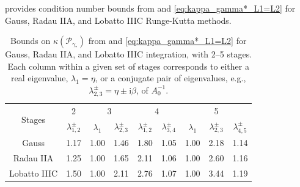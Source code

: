 \documentclass[review]{siamart}
\begin{document}
 provides condition number bounds from  and
\eqref{eq:kappa_gamma*_L1=L2} for Gauss, Radau IIA, and Lobatto IIIC Runge-Kutta methods.
%
{
\renewcommand{\arraystretch}{1.15}
\begin{table}[!ht]
  \centering
  \begin{tabular}{| c | c | cc | cc | ccc |}  %
  \hline
\multirow{2}{*}{Stages} & 2 & \multicolumn{2}{c}{3} & \multicolumn{2}{|c}{4} & \multicolumn{3}{|c|}{5} \\

& {$\lambda_{1,2}^\pm$} & {$\lambda_1$} & {$\lambda_{2,3}^\pm$} & {$\lambda_{1,2}^\pm$} &
	{$\lambda_{3,4}^\pm$} & {$\lambda_1$} & {$\lambda_{2,3}^\pm$} & {$\lambda_{4,5}^\pm$} \\
\hline
Gauss  & 1.17 & 1.00 & 1.46 & 1.80 & 1.05 & 1.00 & 2.18 & 1.14 \\
Radau IIA  & 1.25 & 1.00 & 1.65 & 2.11 & 1.06 & 1.00 & 2.60 & 1.16 \\
Lobatto IIIC & 1.50 & 1.00 & 2.11 & 2.76 & 1.07 & 1.00 & 3.44 & 1.19 \\\hline
  \end{tabular}
  \caption{Bounds on $\kappa(\mathcal{P}_{\gamma_*})$ from  and
  \eqref{eq:kappa_gamma*_L1=L2} for Gauss, Radau IIA, and Lobatto IIIC integration,
  with 2--5 stages. Each column within a given set of stages corresponds
  to either a real eigenvalue, $\lambda_1 = \eta$, or a conjugate pair of eigenvalues,
  e.g., $\lambda_{2,3}^\pm = \eta \pm \mathrm{i}\beta$, of
  $A_0^{-1}$.}\label{tab:cond}
\end{table}
}
\end{document}
